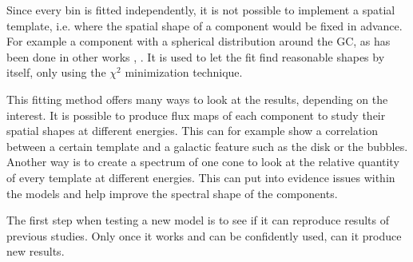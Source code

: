 Since every bin is fitted independently, it is not possible to implement a spatial template, i.e. where the spatial shape of a component would be fixed in advance. For example a component with a spherical distribution around the GC, as has been done in other works \cite{Calore2015}, \cite{Daylan2016}. It is used to let the fit find reasonable shapes by itself, only using the $\chi^2$ minimization technique.


This fitting method offers many ways to look at the results, depending on the interest. It is possible to produce flux maps of each component to study their spatial shapes at different energies. This can for example show a correlation between a certain template and a galactic feature such as the disk or the bubbles. Another way is to create a spectrum of one cone to look at the relative quantity of every template at different energies. This can put into evidence issues within the models and help improve the spectral shape of the components.

The first step when testing a new model is to see if it can reproduce results of previous studies. Only once it works and can be confidently used, can it produce new results.




